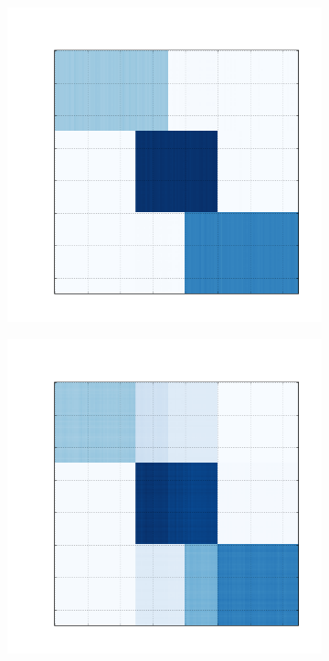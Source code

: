 \documentclass[10pt]{beamer}
\begin{document}
\begin{frame}
\begin{figure}[H]
\begin{subfigure}[b]{0.13\textwidth}
      \end{subfigure}
      \begin{subfigure}[b]{0.13\textwidth}
          \includegraphics[width=\textwidth]{img/d-reconstruction-fkmeans.png}
      \end{subfigure}
      \begin{subfigure}[b]{0.13\textwidth}
          \includegraphics[width=\textwidth]{img/d-reconstruction-onmtf.png}

\end{subfigure}
\end{figure}
\end{frame}
\end{document}
